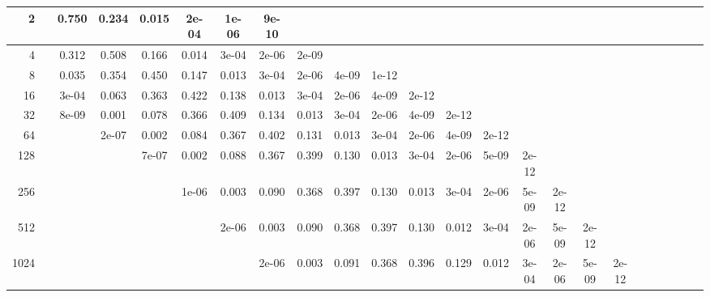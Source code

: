 \begin{appendices}
\begin{sidewaystable}
{\begin{tabular}{r|ccccccccccccccccccccccc}
2 &&0.750 &0.234 &0.015 &2e-04 &1e-06 &9e-10 &&&&&&&&\\\hline

4 &&0.312 &0.508 &0.166 &0.014 &3e-04 &2e-06 &2e-09 &&&&&&&\\\hline

8 &&0.035 &0.354 &0.450 &0.147 &0.013 &3e-04 &2e-06 &4e-09 &1e-12 &&&&&&\\\hline

16 &&3e-04 &0.063 &0.363 &0.422 &0.138 &0.013 &3e-04 &2e-06 &4e-09 &2e-12 &&&&&\\\hline

32 &&8e-09 &0.001 &0.078 &0.366 &0.409 &0.134 &0.013 &3e-04 &2e-06 &4e-09 &2e-12 &&&&\\\hline

64 &&&2e-07 &0.002 &0.084 &0.367 &0.402 &0.131 &0.013 &3e-04 &2e-06 &4e-09 &2e-12 &&&\\\hline

128 &&&&7e-07 &0.002 &0.088 &0.367 &0.399 &0.130 &0.013 &3e-04 &2e-06 &5e-09 &2e-12 &&\\\hline

256 &&&&&1e-06 &0.003 &0.090 &0.368 &0.397 &0.130 &0.013 &3e-04 &2e-06 &5e-09 &2e-12 & \\\hline

512 &&&&&&2e-06 &0.003 &0.090 &0.368 &0.397 &0.130 &0.012 &3e-04 &2e-06 &5e-09 &2e-12 \\\hline
1024 &&&&&&&2e-06 &0.003 &0.091 &0.368 &0.396 &0.129 &0.012 &3e-04 &2e-06 &5e-09 &2e-12 \\
\bottomrule
\end{tabular}
}

\begin{tabular}{c}
\\
\end{tabular}
\end{sidewaystable}
\end{appendices}
